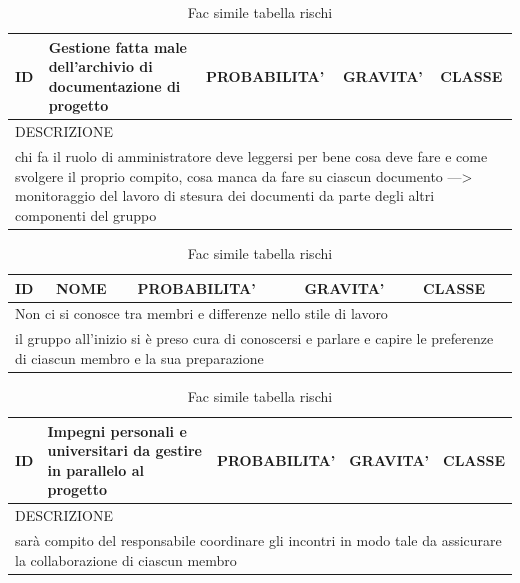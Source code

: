 	\begin{table}[H]
		\centering
		\begin{tabularx}{\columnwidth}{|m{1.5cm}|m{4.2cm}|m{2.7cm}|m{2.7cm}|m{2.7cm}|}
			\hline
			ID & 
			Gestione fatta male dell'archivio di documentazione di progetto & 
			PROBABILITA' & 
			GRAVITA' & 
			CLASSE\\
			\hline
			\multicolumn{5}{|X|}{
				DESCRIZIONE
			}\\
			\hline
			\multicolumn{5}{|X|}{
				chi fa il ruolo di amministratore deve leggersi per bene cosa deve fare e come svolgere il proprio compito, cosa manca da fare su ciascun documento ---> monitoraggio del lavoro di stesura dei documenti da parte degli altri componenti del gruppo
			}\\
			\hline
		\end{tabularx}
		\caption{Fac simile tabella rischi}
	\end{table}

	\begin{table}[H]
		\centering
		\begin{tabularx}{\columnwidth}{|m{1.5cm}|m{4.2cm}|m{2.7cm}|m{2.7cm}|m{2.7cm}|}
			\hline
			ID & 
			NOME & 
			PROBABILITA' & 
			GRAVITA' & 
			CLASSE\\
			\hline
			\multicolumn{5}{|X|}{
				Non ci si conosce tra membri e differenze nello stile di lavoro
			}\\
			\hline
			\multicolumn{5}{|X|}{
				il gruppo all'inizio si è preso cura di conoscersi e parlare e capire le preferenze di ciascun membro e la sua preparazione
			}\\
			\hline
		\end{tabularx}
		\caption{Fac simile tabella rischi}
	\end{table}
	
	\begin{table}[H]
		\centering
		\begin{tabularx}{\columnwidth}{|m{1.5cm}|m{4.2cm}|m{2.7cm}|m{2.7cm}|m{2.7cm}|}
			\hline
			ID & 
			Impegni personali e universitari da gestire in parallelo al progetto & 
			PROBABILITA' & 
			GRAVITA' & 
			CLASSE\\
			\hline
			\multicolumn{5}{|X|}{
				DESCRIZIONE
			}\\
			\hline
			\multicolumn{5}{|X|}{
				sarà compito del responsabile coordinare gli incontri in modo tale da assicurare la collaborazione di ciascun membro
			}\\
			\hline
		\end{tabularx}
		\caption{Fac simile tabella rischi}
	\end{table}
	
